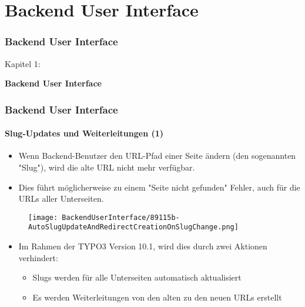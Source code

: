 %

\section{Backend User Interface}
\begin{frame}[fragile]
	\frametitle{Backend User Interface}

	\begin{center}\huge{Kapitel 1:}\end{center}
	\begin{center}\huge{\color{typo3darkgrey}\textbf{Backend User Interface}}\end{center}

\end{frame}


\begin{frame}[fragile]
	\frametitle{Backend User Interface}
	\framesubtitle{Slug-Updates und Weiterleitungen (1)}

	\begin{itemize}
		\item Wenn Backend-Benutzer den URL-Pfad einer Seite ändern (den sogenannten "Slug"),
			wird die alte URL nicht mehr verfügbar.
		\item Dies führt möglicherweise zu einem "Seite nicht gefunden" Fehler, 
			auch für die URLs aller Unterseiten.
	\end{itemize}

	\begin{figure}
		\texttt{[image: BackendUserInterface/89115b-AutoSlugUpdateAndRedirectCreationOnSlugChange.png]}
	\end{figure}

	\begin{itemize}
		\item Im Rahmen der TYPO3 Version 10.1, wird dies durch zwei Aktionen verhindert:

			\begin{itemize}
				\item Slugs werden für alle Unterseiten  automatisch aktualisiert
				\item Es werden Weiterleitungen von den alten zu den neuen URLs erstellt
			\end{itemize}

	\end{itemize}

\end{frame}

